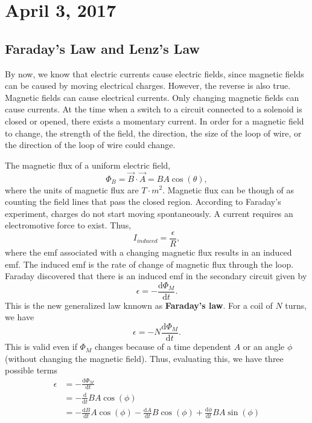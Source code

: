 \documentclass[11pt]{article}
\theoremstyle{plain} %
\theoremstyle{definition}
\theoremstyle{example}
\theoremstyle{remark}
\begin{document}
\section{April 3, 2017}
\subsection{Faraday's Law and Lenz's Law}

By now, we know that electric currents cause electric fields, since magnetic fields can be caused by moving electrical charges. However, the reverse is also true. Magnetic fields can cause electrical currents. Only changing magnetic fields can cause currents. At the time when a switch to a circuit connected to a solenoid is closed or opened, there exists a momentary current. In order for a magnetic field to change, the strength of the field, the direction, the size of the loop of wire, or the direction of the loop of wire could change. 

The magnetic flux of a uniform electric field, 
$$\Phi_B = \vec{B} \cdot \vec{A} = BA\cos(\theta),$$
where the units of magnetic flux are $T\cdot m^2$. Magnetic flux can be though of as counting the field lines that pass the closed region. According to Faraday's experiment, charges do not start moving spontaneously. A current requires an electromotive force to exist. Thus, 
$$I_{induced} = \frac{\epsilon}{R},$$
where the emf associated with a changing magnetic flux results in an induced emf. The induced emf is the rate of change of magnetic flux through the loop. Faraday discovered that there is an induced emf in the secondary circuit given by 
$$\epsilon  =-\frac{\mathrm d\Phi_M}{\mathrm d t}.$$
This is the new generalized law knnown as \textbf{Faraday's law}. For a coil of $N$ turns, we have 
$$\epsilon  =-N\frac{\mathrm d\Phi_M}{\mathrm d t}.$$
This is valid even if $\Phi_M$ changes because of a time dependent $A$ or an angle $\phi$ (without changing the magnetic field). Thus, evaluating this, we have three possible terms 
\begin{align*}\epsilon  &=-\frac{\mathrm d\Phi_M}{\mathrm d t}\\&=-\frac{\mathrm d}{\mathrm d t}BA\cos(\phi)\\
&=-\frac{\mathrm d B}{\mathrm d t}A\cos(\phi)-\frac{\mathrm d A}{\mathrm d t}B\cos(\phi)+\frac{\mathrm d \phi}{\mathrm d t}{BA\sin(\phi)}
\end{align*}
\end{document}
